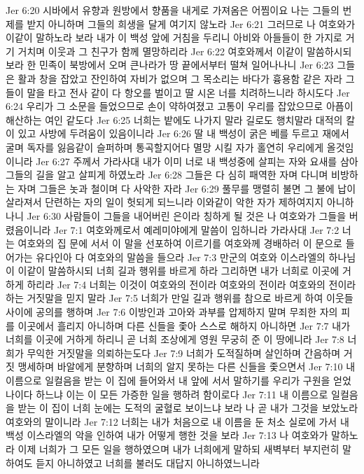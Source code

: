 Jer 6:20  시바에서 유향과 원방에서 향품을 내게로 가져옴은 어찜이요 나는 그들의 번제를 받지 아니하며 그들의 희생을 달게 여기지 않노라
Jer 6:21  그러므로 나 여호와가 이같이 말하노라 보라 내가 이 백성 앞에 거침을 두리니 아비와 아들들이 한 가지로 거기 거치며 이웃과 그 친구가 함께 멸망하리라
Jer 6:22  여호와께서 이같이 말씀하시되 보라 한 민족이 북방에서 오며 큰나라가 땅 끝에서부터 떨쳐 일어나나니
Jer 6:23  그들은 활과 창을 잡았고 잔인하여 자비가 없으며 그 목소리는 바다가 흉용함 같은 자라 그들이 말을 타고 전사 같이 다 항오를 벌이고 딸 시온 너를 치려하느니라 하시도다
Jer 6:24  우리가 그 소문을 들었으므로 손이 약하여졌고 고통이 우리를 잡았으므로 아픔이 해산하는 여인 같도다
Jer 6:25  너희는 밭에도 나가지 말라 길로도 행치말라 대적의 칼이 있고 사방에 두려움이 있음이니라
Jer 6:26  딸 내 백성이 굵은 베를 두르고 재에서 굴며 독자를 잃음같이 슬퍼하며 통곡할지어다 멸망 시킬 자가 홀연히 우리에게 올것임이니라
Jer 6:27  주께서 가라사대 내가 이미 너로 내 백성중에 살피는 자와 요새를 삼아 그들의 길을 알고 살피게 하였노라
Jer 6:28  그들은 다 심히 패역한 자며 다니며 비방하는 자며 그들은 놋과 철이며 다 사악한 자라
Jer 6:29  풀무를 맹렬히 불면 그 불에 납이 살라져서 단련하는 자의 일이 헛되게 되느니라 이와같이 악한 자가 제하여지지 아니하나니
Jer 6:30  사람들이 그들을 내어버린 은이라 칭하게 될 것은 나 여호와가 그들을 버렸음이니라
Jer 7:1  여호와께로서 예레미야에게 말씀이 임하니라 가라사대
Jer 7:2  너는 여호와의 집 문에 서서 이 말을 선포하여 이르기를 여호와께 경배하러 이 문으로 들어가는 유다인아 다 여호와의 말씀을 들으라
Jer 7:3  만군의 여호와 이스라엘의 하나님이 이같이 말씀하시되 너희 길과 행위를 바르게 하라 그리하면 내가 너희로 이곳에 거하게 하리라
Jer 7:4  너희는 이것이 여호와의 전이라 여호와의 전이라 여호와의 전이라 하는 거짓말을 믿지 말라
Jer 7:5  너희가 만일 길과 행위를 참으로 바르게 하여 이웃들 사이에 공의를 행하며
Jer 7:6  이방인과 고아와 과부를 압제하지 말며 무죄한 자의 피를 이곳에서 흘리지 아니하며 다른 신들을 좇아 스스로 해하지 아니하면
Jer 7:7  내가 너희를 이곳에 거하게 하리니 곧 너희 조상에게 영원 무궁히 준 이 땅에니라
Jer 7:8  너희가 무익한 거짓말을 의뢰하는도다
Jer 7:9  너희가 도적질하며 살인하며 간음하며 거짓 맹세하며 바알에게 분향하며 너희의 알지 못하는 다른 신들을 좇으면서
Jer 7:10  내 이름으로 일컬음을 받는 이 집에 들어와서 내 앞에 서서 말하기를 우리가 구원을 얻었나이다 하느냐 이는 이 모든 가증한 일을 행하려 함이로다
Jer 7:11  내 이름으로 일컬음을 받는 이 집이 너희 눈에는 도적의 굴혈로 보이느냐 보라 나 곧 내가 그것을 보았노라 여호와의 말이니라
Jer 7:12  너희는 내가 처음으로 내 이름을 둔 처소 실로에 가서 내 백성 이스라엘의 악을 인하여 내가 어떻게 행한 것을 보라
Jer 7:13  나 여호와가 말하노라 이제 너희가 그 모든 일을 행하였으며 내가 너희에게 말하되 새벽부터 부지런히 말하여도 듣지 아니하였고 너희를 불러도 대답지 아니하였느니라

